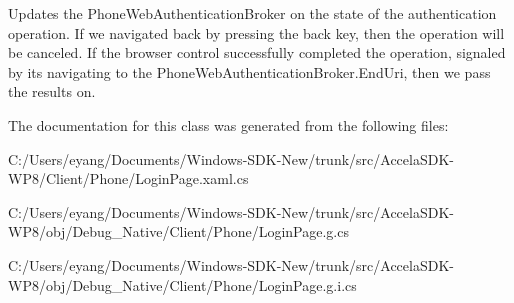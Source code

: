 Updates the Phone\+Web\+Authentication\+Broker on the state of the authentication operation. If we navigated back by pressing the back key, then the operation will be canceled. If the browser control successfully completed the operation, signaled by its navigating to the Phone\+Web\+Authentication\+Broker.\+End\+Uri, then we pass the results on. 



The documentation for this class was generated from the following files\+:\begin{DoxyCompactItemize}
\item 
C\+:/\+Users/eyang/\+Documents/\+Windows-\/\+S\+D\+K-\/\+New/trunk/src/\+Accela\+S\+D\+K-\/\+W\+P8/\+Client/\+Phone/Login\+Page.\+xaml.\+cs\item 
C\+:/\+Users/eyang/\+Documents/\+Windows-\/\+S\+D\+K-\/\+New/trunk/src/\+Accela\+S\+D\+K-\/\+W\+P8/obj/\+Debug\+\_\+\+Native/\+Client/\+Phone/Login\+Page.\+g.\+cs\item 
C\+:/\+Users/eyang/\+Documents/\+Windows-\/\+S\+D\+K-\/\+New/trunk/src/\+Accela\+S\+D\+K-\/\+W\+P8/obj/\+Debug\+\_\+\+Native/\+Client/\+Phone/Login\+Page.\+g.\+i.\+cs\end{DoxyCompactItemize}

